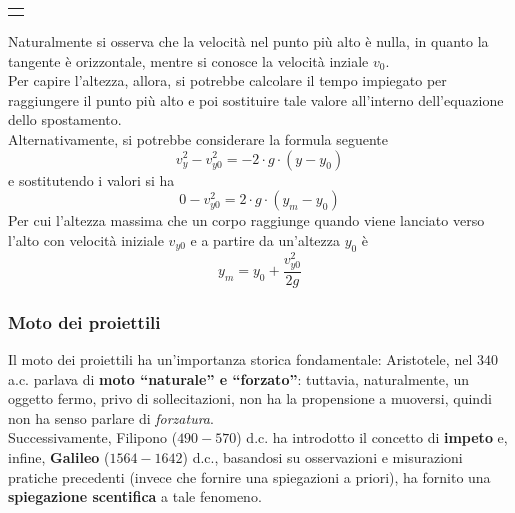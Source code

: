 \documentclass[a4paper]{extarticle}
\newcommand{\quotes}[1]{``#1''}
\begin{document}
\vspace{2em}
\noindent
{}
\begin{tabularx}{\textwidth}{P}
  {
      \centering
  }
\end{tabularx}

\vspace{1em}
\noindent
Naturalmente si osserva che la velocità nel punto più alto è nulla, in quanto la tangente è orizzontale, mentre si conosce la velocità inziale $v_0$.\\
Per capire l'altezza, allora, si potrebbe calcolare il tempo impiegato per raggiungere il punto più alto e poi sostituire tale valore all'interno dell'equazione dello spostamento.\\
 Alternativamente, si potrebbe considerare la formula seguente
\[v_y^2 - v_{y0}^2 = -2 \cdot g \cdot (y - y_0)\]
e sostitutendo i valori si ha
\[0 - v_{y0}^2 = 2 \cdot g \cdot (y_m - y_0)\]
Per cui l'altezza massima che un corpo raggiunge quando viene lanciato verso l'alto con velocità iniziale $v_{y0}$ e a partire da un'altezza $y_0$ è
\[\boxed{y_m = y_0 + \frac{v_{y0}^2}{2g}}\]

\vspace{1em}
\subsubsection{Moto dei proiettili}
Il moto dei proiettili ha un'importanza storica fondamentale: Aristotele, nel $340$ a.c. parlava di \textbf{moto \quotes{naturale} e \quotes{forzato}}: tuttavia, naturalmente, un oggetto fermo, privo di sollecitazioni, non ha la propensione a muoversi, quindi non ha senso parlare di \emph{forzatura}.\\
Successivamente, Filipono ($490-570$) d.c. ha introdotto il concetto di \textbf{impeto} e, infine, \textbf{Galileo} ($1564-1642$) d.c., basandosi su osservazioni e misurazioni pratiche precedenti (invece che fornire una spiegazioni a priori), ha fornito una \textbf{spiegazione scentifica} a tale fenomeno.
\end{document}
